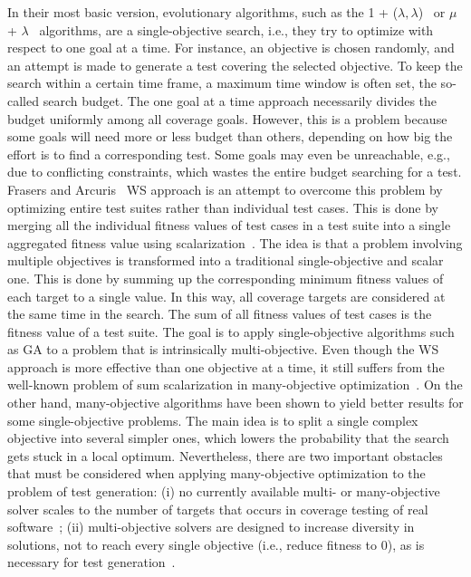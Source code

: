 \documentclass{article}
\begin{document}
In their most basic version, evolutionary algorithms, such as the 1 + ($\lambda,\lambda$)~\cite{Doerr2015} or $\mu$ + $\lambda$~\cite{TerSarkisov2011} algorithms, are a single-objective search, i.e., they try to optimize with respect to one goal at a time. For instance, an objective is chosen randomly, and an attempt is made to generate a test covering the selected objective. To keep the search within a certain time frame, a maximum time window is often set, the so-called search budget. The one goal at a time approach necessarily divides the budget uniformly among all coverage goals. However, this is a problem because some goals will need more or less budget than others, depending on how big the effort is to find a corresponding test. Some goals may even be unreachable, e.g., due to conflicting constraints, which wastes the entire budget searching for a test. Frasers and Arcuris~\cite{Fraser_2013} \ac{WS} approach is an attempt to overcome this problem by optimizing entire test suites rather than individual test cases. This is done by merging all the individual fitness values of test cases in a test suite into a single aggregated fitness value using scalarization~\cite{Deb2014}. The idea is that a problem involving multiple objectives is transformed into a traditional single-objective and scalar one. This is done by summing up the corresponding minimum fitness values of each target to a single value. In this way, all coverage targets are considered at the same time in the search. The sum of all fitness values of test cases is the fitness value of a test suite. The goal is to apply single-objective algorithms such as \ac{GA} to a problem that is intrinsically multi-objective. Even though the \ac{WS} approach is more effective than one objective at a time, it still suffers from the well-known problem of sum scalarization in many-objective optimization~\cite{Deb2014}. On the other hand, many-objective algorithms have been shown to yield better results for some single-objective problems. The main idea is to split a single complex objective into several simpler ones, which lowers the probability that the search gets stuck in a local optimum. Nevertheless, there are two important obstacles that must be considered when applying many-objective optimization to the problem of test generation: (i) no currently available multi- or many-objective solver scales to the number of targets that occurs in coverage testing of real software~\cite{Arcuri_2014}; (ii) multi-objective solvers are designed to increase diversity in solutions, not to reach every single objective (i.e., reduce fitness to 0), as is necessary for test generation~\cite{Panichella2018}. 
\end{document}
